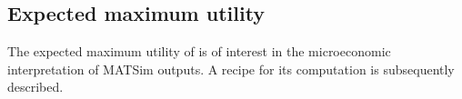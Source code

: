 


\subsection{\label{sub:expected-maximum-utility}Expected maximum utility}

The expected maximum utility of  is of
interest in the microeconomic interpretation of MATSim outputs. 
A recipe for its computation is subsequently described. 

